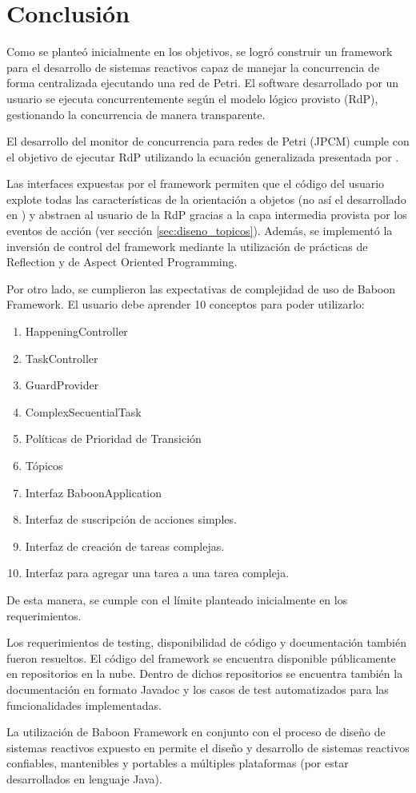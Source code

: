 \section{Conclusión}

Como se planteó inicialmente en los objetivos, se logró construir un framework
para el desarrollo de sistemas reactivos capaz de manejar la concurrencia de
forma centralizada ejecutando una red de Petri. El software desarrollado por un
usuario se ejecuta concurrentemente según el modelo lógico provisto (RdP),
gestionando la concurrencia de manera transparente.

El desarrollo del monitor de concurrencia para redes de Petri (JPCM) cumple con
el objetivo de ejecutar RdP utilizando la ecuación generalizada presentada por
\cite{Ecuacion_generalizada_LAC}.

Las interfaces expuestas por el framework permiten que el código del usuario
explote todas las características de la orientación a objetos (no así el
desarrollado en \cite{chimp}) y abstraen al usuario de la RdP gracias a la capa
intermedia provista por los eventos de acción (ver sección
\ref{sec:diseno_topicos}). Además, se implementó la inversión de control del
framework mediante la utilización de prácticas de Reflection y de Aspect
Oriented Programming.

Por otro lado, se cumplieron las expectativas de complejidad de uso de Baboon
Framework. El usuario debe aprender 10 conceptos para poder utilizarlo:
\begin{enumerate}
  \item HappeningController
  \item TaskController
  \item GuardProvider
  \item ComplexSecuentialTask
  \item Políticas de Prioridad de Transición
  \item Tópicos
  \item Interfaz BaboonApplication
  \item Interfaz de suscripción de acciones simples.
  \item Interfaz de creación de tareas complejas.
  \item Interfaz para agregar una tarea a una tarea compleja.
\end{enumerate}
De esta manera, se cumple con el límite planteado inicialmente en los
requerimientos.

Los requerimientos de testing, disponibilidad de código y documentación también
fueron resueltos. El código del framework se encuentra disponible
públicamente en repositorios en la nube. Dentro de dichos repositorios se
encuentra también la documentación en formato Javadoc y los casos de test
automatizados para las funcionalidades implementadas.

La utilización de Baboon Framework en conjunto con el proceso de diseño de
sistemas reactivos expuesto en \cite{Bentivegna-Ludemann} permite el diseño y
desarrollo de sistemas reactivos confiables, mantenibles y portables a
múltiples plataformas (por estar desarrollados en lenguaje Java).
